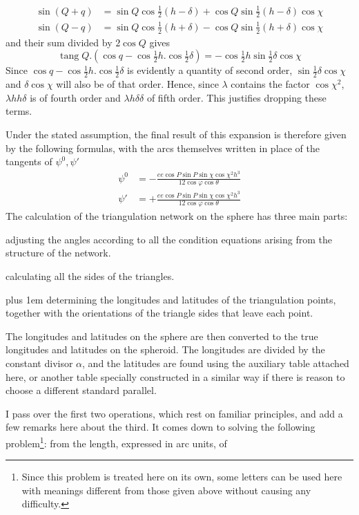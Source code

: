 %
\[
\begin{aligned}
\sin(Q+q)&=\sin Q\cos\tfrac{1}{2}(h-\delta)+\cos Q\sin\tfrac{1}{2}(h-\delta)\cos\chi\\
\sin(Q-q)&=\sin Q\cos\tfrac{1}{2}(h+\delta)-\cos Q\sin\tfrac{1}{2}(h+\delta)\cos\chi
\end{aligned}
\]
and their sum divided by \(2\cos Q\) gives
\[
\operatorname{tang}Q\mathord{.}(\cos q-\cos\tfrac{1}{2}h\mathord{.}\cos\tfrac{1}{2}\delta)=-\cos\tfrac{1}{2}h\sin\tfrac{1}{2}\delta\cos\chi
\]
\indent Since \(\cos q-\cos\tfrac{1}{2}h\mathord{.}\cos\tfrac{1}{2}\delta\) is evidently a quantity of second order, \(\sin\tfrac{1}{2}\delta\cos\chi\) and \(\delta\cos\chi\) will also be of that order. Hence, since \(\lambda\) contains the factor \(\cos\chi^2\), \(\lambda hh\delta\) is of fourth order and \(\lambda h\delta\delta\) of fifth order. This justifies dropping these terms.

Under the stated assumption, the final result of this expansion is therefore given by the following formulas, with the arcs themselves written in place of the tangents of \(\psi^0,\psi'\)
\[
\begin{aligned}
\psi^0&=-\frac{ee\cos P\sin P\sin\chi\cos\chi^2h^3}{12\cos\varphi\cos\theta}\\
\psi'&=+\frac{ee\cos P\sin P\sin\chi\cos\chi^2h^3}{12\cos\varphi\cos\theta}
\end{aligned}
\]
The calculation of the triangulation network on the sphere has three main parts:
\begin{list}{}{\setlength{\leftmargin}{1.8em}\setlength{\labelwidth}{1.4em}\setlength{\labelsep}{.4em}\setlength{\itemsep}{0pt}}
\item[1)] adjusting the angles according to all the condition equations arising from the structure of the network.
\item[2)] calculating all the sides of the triangles.
\item[3)] \begingroup\rightskip=0pt plus 1em
determining the longitudes and latitudes of the triangulation points, together with the orientations of the triangle sides that leave each point.\par\endgroup
\end{list}
\hspace*{\parindent}The longitudes and latitudes on the sphere are then converted to the true longitudes and latitudes on the spheroid. The longitudes are divided by the constant divisor \(\alpha\), and the latitudes are found using the auxiliary table attached here, or another table specially constructed in a similar way if there is reason to choose a different standard parallel.

I pass over the first two operations, which rest on familiar principles, and add a few remarks here about the third. It comes down to solving the following problem\footnote{Since this problem is treated here on its own, some letters can be used here with meanings different from those given above without causing any difficulty.}: from the length, expressed in arc units, of
